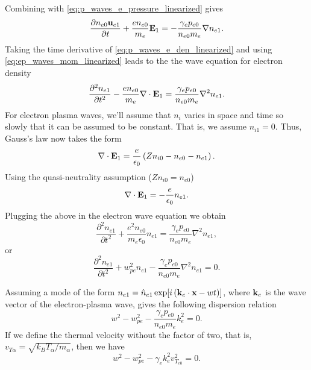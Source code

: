 \documentclass[a4paper,11pt]{report}
\begin{document}
Combining  with \cref{eq:p_waves_e_pressure_linearized} gives
\begin{equation}
    \label{eq:ep_waves_mom_linearized}
    \frac{\partial n_{e0} \mathbf{u}_{e1}}{\partial t} + \frac{e n_{e0}}{m_e} \mathbf{E}_1 = - \frac{\gamma_e p_{e0}}{n_{e0} m_e} \nabla n_{e1}.
\end{equation}
Taking the time derivative of \cref{eq:p_waves_e_den_linearized} and using \cref{eq:ep_waves_mom_linearized} leads to the the wave equation for electron density
\begin{equation}
    \label{eq:ep_waves_den_combined}
    \frac{\partial^2 n_{e1}}{\partial t^2} - \frac{e n_{e0}}{m_e} \nabla \cdot \mathbf{E}_1 = \frac{\gamma_e p_{e0}}{n_{e0} m_e} \nabla^2 n_{e1}.
\end{equation}
For electron plasma waves, we'll assume that $n_{i}$ varies in space and time so slowly that it can be assumed to be constant. That is, we assume $n_{i1} = 0$. Thus, Gauss's law now takes the form
\begin{equation*}
    \nabla \cdot \mathbf{E}_1 = \frac{e}{\epsilon_0} \left ( Z n_{i0} - n_{e0} - n_{e1} \right ).
\end{equation*}
Using the quasi-neutrality assumption ($Zn_{i0} = n_{e0}$)
\begin{equation}
    \label{eq:ep_waves_efield_divergence}
    \nabla \cdot \mathbf{E}_1 = -\frac{e}{\epsilon_0} n_{e1}.
\end{equation}
Plugging the above in the electron wave equation we obtain
\begin{equation*}
    \frac{\partial^2 n_{e1}}{\partial t^2} + \frac{e^2 n_{e0}}{m_e \epsilon_0} n_{e1} = \frac{\gamma_e p_{e0}}{n_{e0} m_e} \nabla^2 n_{e1},
\end{equation*}
or
\begin{equation}
    \frac{\partial^2 n_{e1}}{\partial t^2} + w^2_{pe} n_{e1} - \frac{\gamma_e p_{e0}}{n_{e0} m_e} \nabla^2 n_{e1} = 0.
\end{equation}

Assuming a mode of the form $n_{e1} = \hat{n}_{e1} \exp [ i \left ( \mathbf{k}_e \cdot \mathbf{x} - w t \right ) ]$, where $\mathbf{k}_e$ is the wave vector of the electron-plasma wave, gives the following dispersion relation
\begin{equation}
    w^2 - w^2_{pe} - \frac{\gamma_e p_{e0}}{n_{e0} m_e}  k_e^2 = 0.
\end{equation}
If we define the thermal velocity without the factor of two, that is, $v_{T\alpha} = \sqrt{k_BT_\alpha / m_\alpha}$, then we have
\begin{equation}
    w^2 - w^2_{pe} - \gamma_e k_e^2 v^2_{T_{e0}} = 0.
\end{equation}
\end{document}
